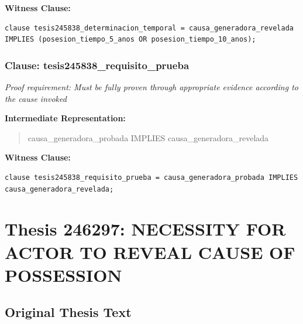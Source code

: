 \documentclass[11pt,a4paper]{article}
\begin{document}
\textbf{Witness Clause:}

\begin{lstlisting}[style=witnessstyle, language=Witness]
clause tesis245838_determinacion_temporal = causa_generadora_revelada IMPLIES (posesion_tiempo_5_anos OR posesion_tiempo_10_anos);
\end{lstlisting}

\subsubsection{Clause: tesis245838\_requisito\_prueba}

\textit{Proof requirement: Must be fully proven through appropriate evidence according to the cause invoked}

\textbf{Intermediate Representation:}

\begin{quote}
causa\_generadora\_probada IMPLIES causa\_generadora\_revelada
\end{quote}

\textbf{Witness Clause:}

\begin{lstlisting}[style=witnessstyle, language=Witness]
clause tesis245838_requisito_prueba = causa_generadora_probada IMPLIES causa_generadora_revelada;
\end{lstlisting}

\newpage

\section{Thesis 246297: NECESSITY FOR ACTOR TO REVEAL CAUSE OF POSSESSION}
\label{thesis:246297}

\subsection{Original Thesis Text}
\end{document}
